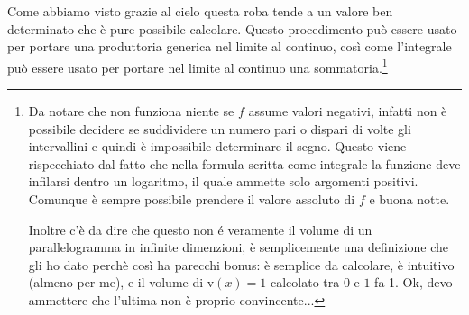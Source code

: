 \documentclass[11pt,a4paper]{report}
\newcommand{\vettorec}[1]{\textrm{#1}}
\theoremstyle{definition}
\theoremstyle{plain}
\theoremstyle{plain}
\begin{document}
			Come abbiamo visto grazie al cielo questa roba tende a un valore ben determinato che è pure possibile calcolare. Questo procedimento può essere usato per portare una produttoria generica nel limite al continuo, così come l'integrale può essere usato per portare nel limite al continuo una sommatoria.\footnote{
				Da notare che non funziona niente se $f$ assume valori negativi, infatti non è possibile decidere se suddividere un numero pari o dispari di volte gli intervallini e quindi è impossibile determinare il segno.
				\newline Questo viene rispecchiato dal fatto che nella formula scritta come integrale la funzione deve infilarsi dentro un logaritmo, il quale ammette solo argomenti positivi.
				\newline Comunque è sempre possibile prendere il valore assoluto di $f$ e buona notte.\newline

				Inoltre c'è da dire che questo non é veramente il volume di un parallelogramma in infinite dimenzioni, è semplicemente una definizione che gli ho dato perchè così ha parecchi bonus: è semplice da calcolare, è intuitivo (almeno per me), e il volume di $\vettorec v(x)=1$ calcolato tra $0$ e $1$ fa 1. Ok, devo ammettere che l'ultima non è proprio convincente...\newline}
\end{document}
